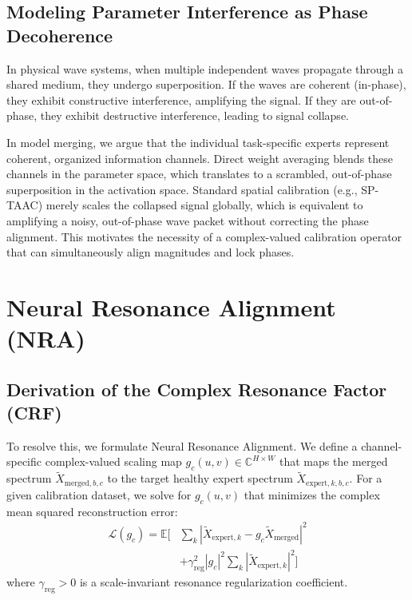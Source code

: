 \documentclass{article}
\theoremstyle{plain}
\theoremstyle{definition}
\theoremstyle{remark}
\begin{document}
\subsection{Modeling Parameter Interference as Phase Decoherence}
In physical wave systems, when multiple independent waves propagate through a shared medium, they undergo superposition. If the waves are coherent (in-phase), they exhibit constructive interference, amplifying the signal. If they are out-of-phase, they exhibit destructive interference, leading to signal collapse. 

In model merging, we argue that the individual task-specific experts represent coherent, organized information channels. Direct weight averaging blends these channels in the parameter space, which translates to a scrambled, out-of-phase superposition in the activation space. Standard spatial calibration (e.g., SP-TAAC) merely scales the collapsed signal globally, which is equivalent to amplifying a noisy, out-of-phase wave packet without correcting the phase alignment. This motivates the necessity of a complex-valued calibration operator that can simultaneously align magnitudes and lock phases.

\section{Neural Resonance Alignment (NRA)}
\label{submission-nra}
\subsection{Derivation of the Complex Resonance Factor (CRF)}
To resolve this, we formulate Neural Resonance Alignment. We define a channel-specific complex-valued scaling map $g_c(u, v) \in \mathbb{C}^{H \times W}$ that maps the merged spectrum $\tilde{X}_{\text{merged}, b, c}$ to the target healthy expert spectrum $\tilde{X}_{\text{expert}, k, b, c}$. For a given calibration dataset, we solve for $g_c(u, v)$ that minimizes the complex mean squared reconstruction error:
\begin{align}
    \mathcal{L}(g_c) = \mathbb{E} \bigg[ &\sum_k \left| \tilde{X}_{\text{expert}, k} - g_c \tilde{X}_{\text{merged}} \right|^2 \nonumber \\
    &+ \gamma_{\text{reg}}^2 \left| g_c \right|^2 \sum_k \left| \tilde{X}_{\text{expert}, k} \right|^2 \bigg]
\end{align}
where $\gamma_{\text{reg}} > 0$ is a scale-invariant resonance regularization coefficient. 
\end{document}
